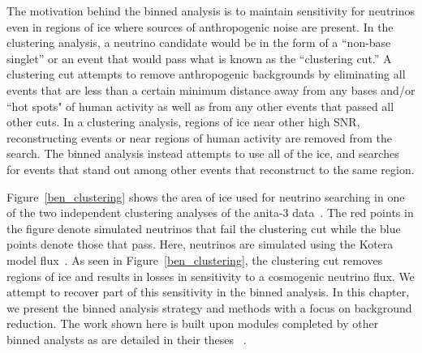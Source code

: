 The motivation behind the binned analysis is to maintain 
sensitivity for neutrinos even in regions of ice where
sources of anthropogenic noise are present.
In the clustering analysis, a neutrino candidate would be 
in the form of a ``non-base singlet'' or an event that would pass what is known as the ``clustering cut.'' A clustering cut attempts to remove anthropogenic backgrounds by eliminating all events that are less than a certain minimum distance away from any bases and/or ``hot spots" of human activity as well as from any other events that passed all other cuts. In a clustering analysis, regions of ice near other high SNR, reconstructing events or near regions of human activity are removed from the search.  The binned analysis instead attempts to use all of the ice, and searches for events that stand out among other events that reconstruct to the same region.

Figure~\ref{ben_clustering} shows the area of ice used
for neutrino searching in one of the two independent clustering analyses of the \gls{anita}-3 data~\cite{diffuse}. The red points in the figure denote simulated neutrinos that fail the clustering cut while the blue points denote those that pass. 
Here, neutrinos are simulated using the Kotera model flux~\cite{kotera}.
As seen in Figure~\ref{ben_clustering}, the 
clustering cut removes regions of ice and results in losses in sensitivity to a cosmogenic neutrino flux. 
We attempt to recover part of this sensitivity in the binned analysis. 
In this chapter, we present the binned analysis strategy 
and methods with a focus on background reduction. The work shown here is built upon modules completed by other binned analysts as are detailed in their theses ~\cite{brianDaileyThesis,samStaffordThesis,jacobGordonThesis}.


